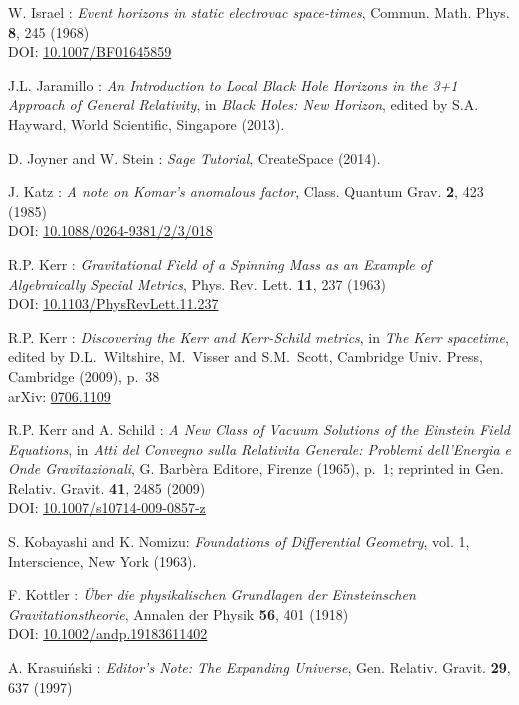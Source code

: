 \begin{thebibliography}{123}
W. Israel : {\em Event horizons in static electrovac space-times},
Commun. Math. Phys. {\bf 8}, 245 (1968)\\
DOI: \href{http://dx.doi.org/10.1007/BF01645859}{10.1007/BF01645859}

J.L. Jaramillo : {\em An Introduction to Local Black Hole Horizons in the 3+1
Approach of General Relativity}, in {\em Black Holes: New Horizon}, edited
by S.A. Hayward, World Scientific, Singapore (2013).

D. Joyner and W. Stein : {\em Sage Tutorial}, CreateSpace (2014).

J. Katz :
{\em A note on Komar's anomalous factor},
Class. Quantum Grav. {\bf 2}, 423 (1985)\\
DOI: \href{http://dx.doi.org/10.1088/0264-9381/2/3/018}{10.1088/0264-9381/2/3/018}

R.P. Kerr :
{\em Gravitational Field of a Spinning Mass as an Example of Algebraically Special Metrics},
Phys. Rev. Lett. {\bf 11}, 237 (1963)\\
DOI: \href{http://dx.doi.org/10.1103/PhysRevLett.11.237}{10.1103/PhysRevLett.11.237}

R.P. Kerr : {\em Discovering the Kerr and Kerr-Schild metrics},
in {\em The Kerr spacetime}, edited by D.L.~Wiltshire, M.~Visser and S.M.~Scott,
Cambridge Univ. Press, Cambridge (2009), p.~38\\
arXiv: \href{https://arxiv.org/abs/0706.1109}{0706.1109}

R.P. Kerr and A. Schild :
{\em A New Class of Vacuum Solutions of the Einstein Field Equations},
in {\em Atti del Convegno sulla Relativita Generale: Problemi
dell’Energia e Onde Gravitazionali}, G. Barbèra Editore,
Firenze (1965), p.~1; reprinted in
Gen. Relativ. Gravit. {\bf 41}, 2485 (2009)\\
DOI: \href{http://dx.doi.org/10.1007/s10714-009-0857-z}{10.1007/s10714-009-0857-z}

S. Kobayashi and K. Nomizu:
{\em Foundations of Differential Geometry}, vol. 1,
Interscience, New York (1963).

F.  Kottler :
{\em \"Uber die physikalischen Grundlagen der Einsteinschen Gravitationstheorie},
Annalen der Physik {\bf 56}, 401 (1918)\\
DOI: \href{http://dx.doi.org/10.1002/andp.19183611402}{10.1002/andp.19183611402}

A. Krasui\'nski :
{\em Editor's Note: The Expanding Universe},
Gen. Relativ. Gravit. {\bf 29}, 637 (1997)


\end{thebibliography}
